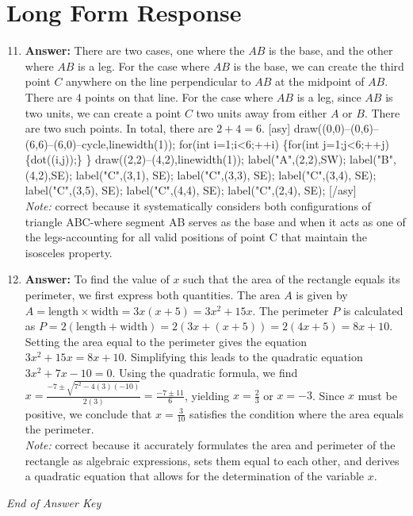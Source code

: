 \documentclass[12pt]{article}
\begin{document}
\section*{Long Form Response}
\begin{enumerate}[label=\arabic*.]
\setcounter{enumi}{10}
\item \textbf{Answer:} There are two cases, one where the $AB$ is the base, and the other where $AB$ is a leg. For the case where $AB$ is the base, we can create the third point $C$ anywhere on the line perpendicular to $AB$ at the midpoint of $AB$. There are $4$ points on that line. For the case where $AB$ is a leg, since $AB$ is two units, we can create a point $C$ two units away from either $A$ or $B$. There are two such points. In total, there are $2+4=\boxed{6}$. [asy] draw((0,0)--(0,6)--(6,6)--(6,0)--cycle,linewidth(1)); for(int i=1;i\textless{}6;++i) \{for(int j=1;j\textless{}6;++j) \{dot((i,j));\} \} draw((2,2)--(4,2),linewidth(1)); label("A",(2,2),SW); label("B",(4,2),SE); label("C",(3,1), SE); label("C",(3,3), SE); label("C",(3,4), SE); label("C",(3,5), SE); label("C",(4,4), SE); label("C",(2,4), SE); [/asy]
\\ \textit{Note:} correct because it systematically considers both configurations of triangle ABC-where segment AB serves as the base and when it acts as one of the legs-accounting for all valid positions of point C that maintain the isosceles property.
\item \textbf{Answer:} To find the value of \( x \) such that the area of the rectangle equals its perimeter, we first express both quantities. The area \( A \) is given by \( A = \text{length} \times \text{width} = 3 x(x + 5) = 3 x^2 + 15 x \). The perimeter \( P \) is calculated as \( P = 2(\text{length} + \text{width}) = 2(3 x + (x + 5)) = 2(4 x + 5) = 8 x + 10 \). Setting the area equal to the perimeter gives the equation \( 3 x^2 + 15 x = 8 x + 10 \). Simplifying this leads to the quadratic equation \( 3 x^2 + 7 x - 10 = 0 \). Using the quadratic formula, we find \( x = \frac{-7 \pm \sqrt{7^2 - 4(3)(-10)}}{2(3)} = \frac{-7 \pm 11}{6} \), yielding \( x = \frac{2}{3} \) or \( x = -3 \). Since \( x \) must be positive, we conclude that \( x = \frac{3}{10} \) satisfies the condition where the area equals the perimeter.
\\ \textit{Note:} correct because it accurately formulates the area and perimeter of the rectangle as algebraic expressions, sets them equal to each other, and derives a quadratic equation that allows for the determination of the variable \( x \).
\end{enumerate}

\vfill
\noindent\textit{End of Answer Key}
\end{document}
